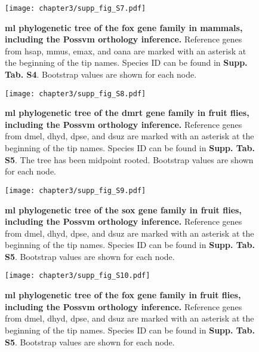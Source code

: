 \documentclass[../main.tex]{subfiles}
\begin{document}
\begin{figure}[ht]
	\centering
	\texttt{[image: chapter3/supp\_fig\_S7.pdf]}
	\captionsetup{width=\textwidth}
	\caption{
		\textbf{\gls{ml} phylogenetic tree of the \gls{fox} gene family in mammals, including the Possvm orthology inference.} Reference genes from \gls{hsap}, \gls{mmus}, \gls{emax}, and \gls{oana} are marked with an asterisk at the beginning of the tip names. Species ID can be found in \textbf{Supp. Tab. S4}. Bootstrap values are shown for each node.
	}
	\label{suppFig:fox_mammals}
\end{figure}

\begin{figure}[ht]
	\centering
	\texttt{[image: chapter3/supp\_fig\_S8.pdf]}
	\captionsetup{width=\textwidth}
	\caption{
		\textbf{\gls{ml} phylogenetic tree of the \gls{dmrt} gene family in fruit flies, including the Possvm orthology inference.} Reference genes from \gls{dmel}, \gls{dhyd}, \gls{dpse}, and \gls{dsuz} are marked with an asterisk at the beginning of the tip names. Species ID can be found in \textbf{Supp. Tab. S5}. The tree has been midpoint rooted. Bootstrap values are shown for each node.
	}
	\label{suppFig:dmrt_drosophila}
\end{figure}

\begin{figure}[ht]
	\centering
	\texttt{[image: chapter3/supp\_fig\_S9.pdf]}
	\captionsetup{width=\textwidth}
	\caption{
		\textbf{\gls{ml} phylogenetic tree of the \gls{sox} gene family in fruit flies, including the Possvm orthology inference.} Reference genes from \gls{dmel}, \gls{dhyd}, \gls{dpse}, and \gls{dsuz} are marked with an asterisk at the beginning of the tip names. Species ID can be found in \textbf{Supp. Tab. S5}. Bootstrap values are shown for each node.
	}
	\label{suppFig:sox_drosophila}
\end{figure}

\begin{figure}[ht]
	\centering
	\texttt{[image: chapter3/supp\_fig\_S10.pdf]}
	\captionsetup{width=\textwidth}
	\caption{
		\textbf{\gls{ml} phylogenetic tree of the \gls{fox} gene family in fruit flies, including the Possvm orthology inference.} Reference genes from \gls{dmel}, \gls{dhyd}, \gls{dpse}, and \gls{dsuz} are marked with an asterisk at the beginning of the tip names. Species ID can be found in \textbf{Supp. Tab. S5}. Bootstrap values are shown for each node.
	}
	\label{suppFig:fox_drosophila}
\end{figure}
\end{document}
